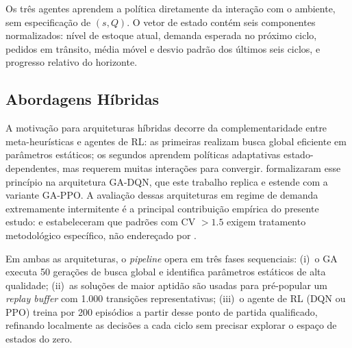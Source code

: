 \documentclass[a4paper,11pt]{article}
\begin{document}
Os três agentes aprendem a política diretamente da interação com
o ambiente, sem especificação de $(s, Q)$. O vetor de estado
contém seis componentes normalizados: nível de estoque atual,
demanda esperada no próximo ciclo, pedidos em trânsito, média
móvel e desvio padrão dos últimos seis ciclos, e progresso
relativo do horizonte.

\subsection{Abordagens Híbridas}

A motivação para arquiteturas híbridas decorre da complementaridade
entre meta-heurísticas e agentes de RL: as primeiras realizam busca
global eficiente em parâmetros estáticos; os segundos aprendem
políticas adaptativas estado-dependentes, mas requerem muitas
interações para convergir. \citet{zabraoui:2025} formalizaram esse
princípio na arquitetura GA-DQN, que este trabalho replica e estende
com a variante GA-PPO. A avaliação dessas arquiteturas em regime de
demanda extremamente intermitente é a principal contribuição empírica
do presente estudo: \citet{croston:1972} e \citet{syntetos:2001}
estabeleceram que padrões com CV $> 1.5$ exigem tratamento
metodológico específico, não endereçado por \citet{zabraoui:2025}.

Em ambas as arquiteturas, o \textit{pipeline} opera em três fases
sequenciais: (i)~o GA executa 50 gerações de busca global e identifica
parâmetros estáticos de alta qualidade; (ii)~as soluções de maior
aptidão são usadas para pré-popular um \textit{replay buffer} com
1.000 transições representativas; (iii)~o agente de RL (DQN ou PPO)
treina por 200 episódios a partir desse ponto de partida qualificado,
refinando localmente as decisões a cada ciclo sem precisar explorar
o espaço de estados do zero.
\end{document}
